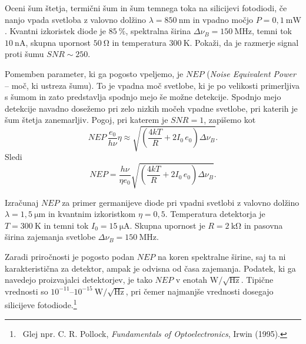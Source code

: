\begin{definition}
Oceni šum štetja, termični šum in šum temnega toka na silicijevi fotodiodi, če 
nanjo vpada svetloba z valovno dolžino $\lambda=850~\si{\nano\meter}$
in vpadno močjo $P=0,1~\si{\milli\watt}$. Kvantni izkoristek diode je $85~\%$,
spektralna širina $\Delta\nu_B=150~\si{\mega\hertz}$, temni tok $10~\si{\nano\ampere}$,
skupna upornost $50~\si{\ohm}$ in temperatura $300~\si{\kelvin}$. Pokaži, 
da je razmerje signal proti šumu $SNR\sim250$. 
\end{definition}

Pomemben parameter, ki ga pogosto vpeljemo, je $NEP$ ({\it Noise Equivalent Power} -- 
moč, ki ustreza šumu). To je vpadna moč svetlobe, ki je po velikosti primerljiva 
s šumom in zato predstavlja spodnjo mejo še možne detekcije. Spodnjo mejo detekcije
navadno dosežemo pri zelo nizkih močeh vpadne svetlobe, pri katerih je šum štetja zanemarljiv.
Pogoj, pri katerem je $SNR=1$, zapišemo kot
\begin{equation}
NEP\, \frac{e_0}{h \nu} \eta \approx \sqrt{\left(\frac{4 kT}{R} + 2 I_0\,e_0 \right) \Delta\nu_B}.
\end{equation}
Sledi
\begin{equation}
NEP = \frac{h \nu}{\eta e_0}\sqrt{\left(\frac{4 kT}{R} + 2 I_0\,e_0 \right) \Delta\nu_B}.
\label{NEP}
\end{equation}
\begin{definition}
Izračunaj $NEP$ za primer germanijeve diode pri vpadni svetlobi z valovno dolžino
$\lambda = 1,5~\si{\micro\meter}$ in kvantnim izkoristkom $\eta=0,5$. Temperatura detektorja
je $T=300~\si{\kelvin}$ in temni tok $I_0=15~\si{\micro\ampere}$. Skupna upornost
je $R=2~\si{\kilo\ohm}$ in pasovna širina zajemanja svetlobe
$\Delta\nu_B=150~\si{\mega\hertz}$.
\end{definition}

\begin{remark}
Zaradi priročnosti je pogosto podan $NEP$ na koren spektralne širine, saj ta ni 
karakteristična za detektor, ampak je odvisna od časa zajemanja. Podatek, ki 
ga navedejo proizvajalci detektorjev, je tako $NEP$ v enotah 
$\si{\watt}/\sqrt{\si{\hertz}}$. Tipične vrednosti so 
$10^{-11}$--$10^{-15}~\si{\watt}/\sqrt{\si{\hertz}}$, pri čemer najmanjše vrednosti
dosegajo silicijeve fotodiode.\footnote{~Glej npr. C. R. Pollock, {\it Fundamentals of Optoelectronics}, Irwin (1995).}
\end{remark}

